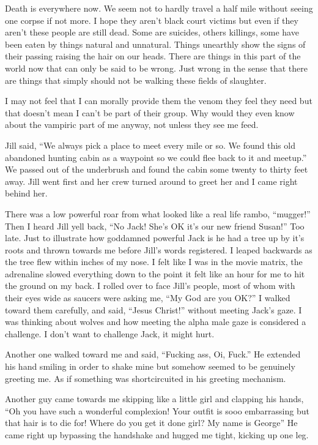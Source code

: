 Death is everywhere now. We seem not to hardly travel a half mile without seeing one corpse if not more. I hope they aren't black court victims but even if they aren't these people are still dead. Some are suicides, others killings, some have been eaten by things natural and unnatural. Things unearthly show the signs of their passing raising the hair on our heads. There are things in this part of the world now that can only be said to be wrong. Just wrong in the sense that there are things that simply should not be walking these fields of slaughter. 

I may not feel that I can morally provide them the venom they feel they need but that doesn't mean I can't be part of their group. Why would they even know about the vampiric part of me anyway, not unless they see me feed. 

Jill said, ``We always pick a place to meet every mile or so. We found this old abandoned hunting cabin as a waypoint so we could flee back to it and meetup.'' We passed out of the underbrush and found the cabin some twenty to thirty feet away. Jill went first and her crew turned around to greet her and I came right behind her.

There was a low powerful roar from what looked like a real life rambo, ``mugger!'' Then I heard Jill yell back, ``No Jack! She's OK it's our new friend Susan!'' Too late. Just to illustrate how goddamned powerful Jack is he had a tree up by it's roots and thrown towards me before Jill's words registered. I leaped backwards as the tree flew within inches of my nose. I felt like I was in the movie matrix, the adrenaline slowed everything down to the point it felt like an hour for me to hit the ground on my back. I rolled over to face Jill's people, most of whom with their eyes wide as saucers were asking me, ``My God are you OK?'' I walked toward them carefully, and said, ``Jesus Christ!'' without meeting Jack's gaze. I was thinking about wolves and how meeting the alpha male gaze is considered a challenge. I don't want to challenge Jack, it might hurt.

Another one walked toward me and said, ``Fucking ass, Oi, Fuck.'' He extended his hand smiling in order to shake mine but somehow seemed to be genuinely greeting me. As if something was shortcircuited in his greeting mechanism.

Another guy came towards me skipping like a little girl and clapping his hands, ``Oh you have such a wonderful complexion! Your outfit is sooo embarrassing but that hair is to die for! Where do you get it done girl? My name is George'' He came right up bypassing the handshake and hugged me tight, kicking up one leg.

